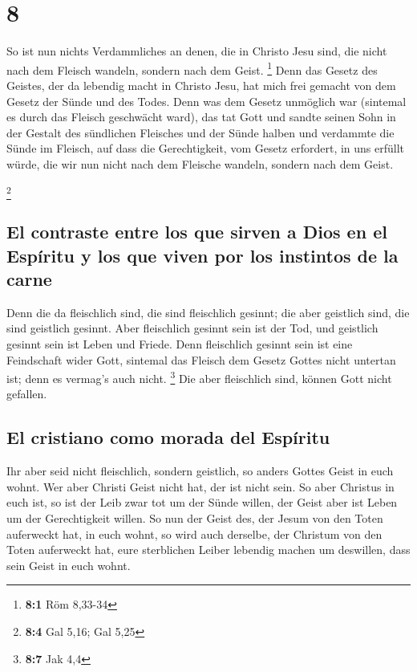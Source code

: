 \hypertarget{section-7}{%
\section{8}\label{section-7}}

 So ist nun nichts Verdammliches an denen, die in Christo
Jesu sind, die nicht nach dem Fleisch wandeln, sondern nach dem Geist.
\footnote{\textbf{8:1} Röm 8,33-34}  Denn das Gesetz des
Geistes, der da lebendig macht in Christo Jesu, hat mich frei gemacht
von dem Gesetz der Sünde und des Todes.  Denn was dem
Gesetz unmöglich war (sintemal es durch das Fleisch geschwächt ward),
das tat Gott und sandte seinen Sohn in der Gestalt des sündlichen
Fleisches und der Sünde halben und verdammte die Sünde im Fleisch,
 auf dass die Gerechtigkeit, vom Gesetz erfordert, in uns
erfüllt würde, die wir nun nicht nach dem Fleische wandeln, sondern nach
dem Geist.

\footnote{\textbf{8:4} Gal 5,16; Gal 5,25}

\hypertarget{el-contraste-entre-los-que-sirven-a-dios-en-el-espuxedritu-y-los-que-viven-por-los-instintos-de-la-carne}{%
\subsection{El contraste entre los que sirven a Dios en el Espíritu y
los que viven por los instintos de la
carne}\label{el-contraste-entre-los-que-sirven-a-dios-en-el-espuxedritu-y-los-que-viven-por-los-instintos-de-la-carne}}

 Denn die da fleischlich sind, die sind fleischlich
gesinnt; die aber geistlich sind, die sind geistlich gesinnt.
 Aber fleischlich gesinnt sein ist der Tod, und geistlich
gesinnt sein ist Leben und Friede.  Denn fleischlich
gesinnt sein ist eine Feindschaft wider Gott, sintemal das Fleisch dem
Gesetz Gottes nicht untertan ist; denn es vermag's auch nicht.
\footnote{\textbf{8:7} Jak 4,4}  Die aber fleischlich
sind, können Gott nicht gefallen.

\hypertarget{el-cristiano-como-morada-del-espuxedritu}{%
\subsection{El cristiano como morada del
Espíritu}\label{el-cristiano-como-morada-del-espuxedritu}}

 Ihr aber seid nicht fleischlich, sondern geistlich, so
anders Gottes Geist in euch wohnt. Wer aber Christi Geist nicht hat, der
ist nicht sein.  So aber Christus in euch ist, so ist der
Leib zwar tot um der Sünde willen, der Geist aber ist Leben um der
Gerechtigkeit willen.  So nun der Geist des, der Jesum
von den Toten auferweckt hat, in euch wohnt, so wird auch derselbe, der
Christum von den Toten auferweckt hat, eure sterblichen Leiber lebendig
machen um deswillen, dass sein Geist in euch wohnt.

